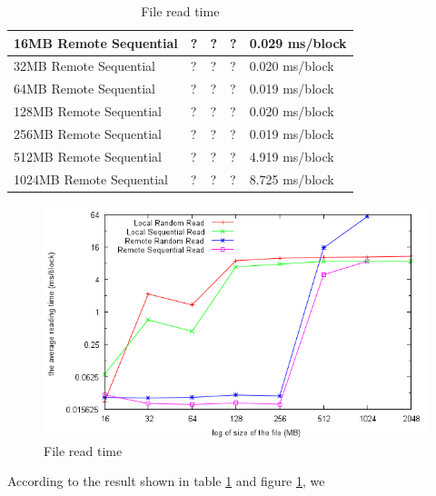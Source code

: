 \begin{table}[h]
\begin{center}
\begin{tabular}{| l | l | l | l | l |}
16MB Remote Sequential	& ?		& ?       & ?        & 0.029    ms/block \\ \hline
32MB Remote Sequential	& ?		& ?       & ?        & 0.020    ms/block \\ \hline
64MB Remote Sequential	& ?		& ?       & ?        & 0.019    ms/block \\ \hline
128MB Remote Sequential 	& ?		& ?       & ?        & 0.020    ms/block \\ \hline
256MB Remote Sequential	& ?		& ?       & ?        & 0.019    ms/block \\ \hline
512MB Remote Sequential	& ?		& ?       & ?        & 4.919    ms/block \\ \hline
1024MB Remote Sequential	& ?		& ?       & ?        & 8.725    ms/block \\ \hline\hline 









\hline
\end{tabular}
\end{center}
\caption{File read time\label{tab:file-read-time}}
\end{table}

\begin{figure}[h]
\begin{center}
\includegraphics[scale=0.8]{fileAccessImage}
\end{center}
\caption {File read time\label{fig:file-access}}

\end{figure}


According to the result shown in table \ref{tab:file-read-time} and figure \ref{fig:file-access}, we


